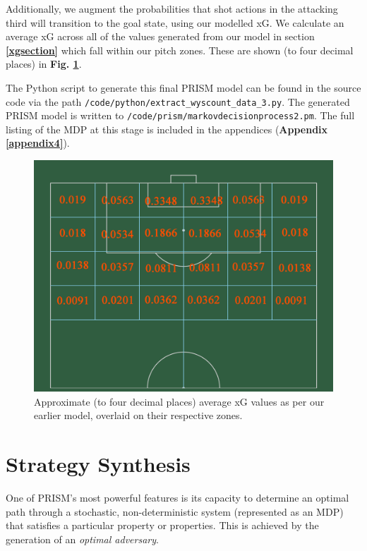 \documentclass{l4proj}
\begin{document}
Additionally, we augment the probabilities that shot actions in the attacking third will transition to the goal state, using our modelled xG. We calculate an average xG across all of the values generated from our model in section \textbf{\ref{xgsection}} which fall within our pitch zones. These are shown (to four decimal places) in \textbf{Fig. \ref{fig:zonesxgd}}.

The Python script to generate this final PRISM model can be found in the source code via the path \texttt{/code/python/extract\_wyscount\_data\_3.py}. The generated PRISM model is written to \texttt{/code/prism/markovdecisionprocess2.pm}. The full listing of the MDP at this stage is included in the appendices (\textbf{Appendix \ref{appendix4}}).

\begin{figure}[h]
    \centering
    \includegraphics[scale=0.1]{images/xoneswxg.png}   
    \caption{Approximate (to four decimal places) average xG values as per our earlier model, overlaid on their respective zones.}
    \label{fig:zonesxgd} 
\end{figure}

\chapter{Strategy Synthesis}

One of PRISM's most powerful features is its capacity to determine an optimal path through a stochastic, non-deterministic system (represented as an MDP) that satisfies a particular property or properties. This is achieved by the generation of an \textit{optimal adversary}.
\end{document}
